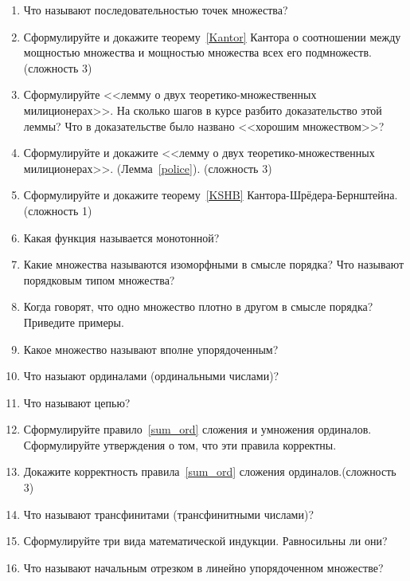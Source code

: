 \documentclass[12pt,oneside]{article}
\theoremstyle{definition}
\begin{document}
\begin{enumerate}
\item  Что называют последовательностью точек множества?

\item  Сформулируйте и докажите теорему~\ref{Kantor}  Кантора о соотношении между мощностью множества и мощностью множества всех его подмножеств.(сложность 3)

\item  Сформулируйте <<лемму о двух теоретико-множественных милиционерах>>. На сколько шагов в курсе разбито доказательство этой леммы? Что в доказательстве было названо <<хорошим множеством>>?

\item  Сформулируйте и докажите <<лемму о двух теоретико-множественных милиционерах>>.  (Лемма~\ref{police}). (сложность 3)

\item  Сформулируйте и докажите теорему~\ref{KSHB} Кантора-Шрёдера-Бернштейна.(сложность 1)

\item  Какая функция называется монотонной?

\item Какие множества называются изоморфными в смысле порядка? Что называют порядковым типом множества?

\item  Когда говорят, что одно множество плотно в другом в смысле порядка? Приведите примеры.

\item  Какое множество называют вполне упорядоченным?

\item  Что назыают ординалами (ординальными числами)? 

\item Что называют цепью?

\item  Сформулируйте правило~\ref{sum_ord} сложения и умножения ординалов. Сформулируйте утверждения о том, что эти правила корректны. 

\item Докажите корректность правила~\ref{sum_ord} сложения ординалов.(сложность 3) 

\item  Что называют трансфинитами (трансфинитными числами)?

\item Сформулируйте три вида математической индукции. Равносильны ли они?

\item Что называют начальным отрезком в линейно упорядоченном множестве?


\end{enumerate}
\end{document}
